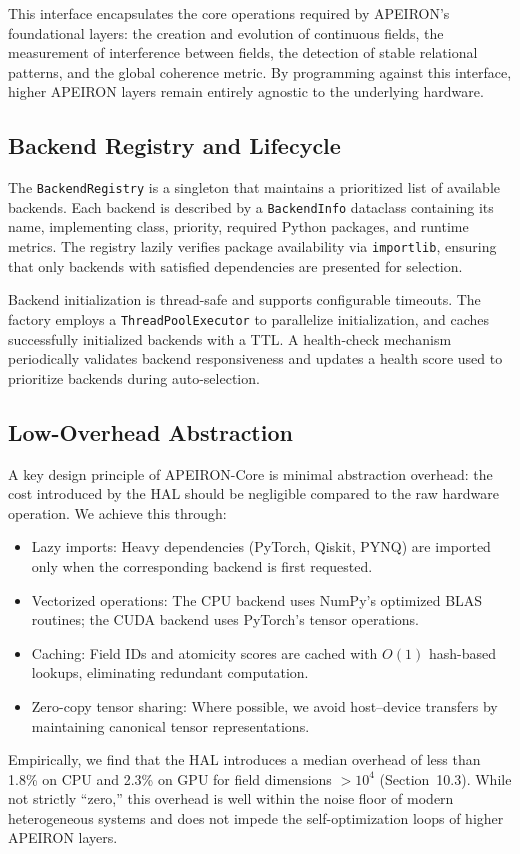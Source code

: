 This interface encapsulates the core operations required by APEIRON's foundational layers: the creation and evolution of continuous fields, the measurement of interference between fields, the detection of stable relational patterns, and the global coherence metric. By programming against this interface, higher APEIRON layers remain entirely agnostic to the underlying hardware.

\subsection{Backend Registry and Lifecycle}

The \texttt{BackendRegistry} is a singleton that maintains a prioritized list of available backends. Each backend is described by a \texttt{BackendInfo} dataclass containing its name, implementing class, priority, required Python packages, and runtime metrics. The registry lazily verifies package availability via \texttt{importlib}, ensuring that only backends with satisfied dependencies are presented for selection.

Backend initialization is thread-safe and supports configurable timeouts. The factory employs a \texttt{ThreadPoolExecutor} to parallelize initialization, and caches successfully initialized backends with a TTL. A health-check mechanism periodically validates backend responsiveness and updates a health score used to prioritize backends during auto-selection.

\subsection{Low-Overhead Abstraction}

A key design principle of APEIRON-Core is minimal abstraction overhead: the cost introduced by the HAL should be negligible compared to the raw hardware operation. We achieve this through:

\begin{itemize}
    \item Lazy imports: Heavy dependencies (PyTorch, Qiskit, PYNQ) are imported only when the corresponding backend is first requested.
    \item Vectorized operations: The CPU backend uses NumPy's optimized BLAS routines; the CUDA backend uses PyTorch's tensor operations.
    \item Caching: Field IDs and atomicity scores are cached with \(O(1)\) hash-based lookups, eliminating redundant computation.
    \item Zero-copy tensor sharing: Where possible, we avoid host–device transfers by maintaining canonical tensor representations.
\end{itemize}

Empirically, we find that the HAL introduces a median overhead of less than 1.8\% on CPU and 2.3\% on GPU for field dimensions \(>10^4\) (Section~10.3). While not strictly ``zero,'' this overhead is well within the noise floor of modern heterogeneous systems and does not impede the self-optimization loops of higher APEIRON layers.